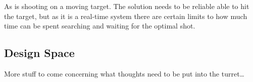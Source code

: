 As \name is shooting on a moving target. The solution needs to be reliable able
to hit the target, but as it is a real-time system there are certain limits to
how much time can be spent searching and waiting for the optimal shot.





\subsection{Design Space}
More stuff to come concerning what thoughts need to be put into the
turret\ldots

% 
% 
% 
% 
